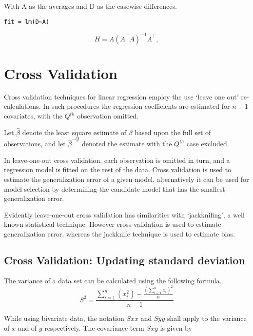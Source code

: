 \documentclass[12pt, a4paper]{article}
\begin{document}
With A as the averages and D as the casewise differences.
\begin{verbatim}
fit = lm(D~A)
\end{verbatim}

\begin{displaymath}
H = A \left(A^\top  A\right)^{-1} A^\top ,
\end{displaymath}

\newpage
\section{Cross Validation} %

Cross validation techniques for linear regression employ the use `leave one out' re-calculations. In such procedures the regression coefficients are estimated for $n-1$ covariates, with the $Q^{th}$ observation omitted.

Let $\hat{\beta}$ denote the least square estimate of $\beta$ based upon the full set of observations, and let
$\hat{\beta}^{-Q}$ denoted the estimate with the $Q^{th}$ case
excluded.


In leave-one-out cross validation, each observation is omitted in turn, and a regression model is fitted on the rest of the data. Cross validation is used to estimate the generalization error of a given model. alternatively it can be used for model selection by determining the candidate model that has the smallest generalization error.


Evidently leave-one-out cross validation has similarities with `jackknifing', a well known statistical technique. However cross validation is used to estimate generalization error, whereas the jackknife technique is used to estimate bias.

\subsection{Cross Validation: Updating standard deviation} %

The variance of a data set can be calculated using the following formula.
\begin{equation}
S^{2}=\frac{\sum_{i=1}^{n}(x_{i}^{2})-\frac{(\sum_{i=1}^{n}x_{i})^{2}}{n}}{n-1}
\end{equation}

While using bivariate data, the notation $Sxx$ and $Syy$ shall apply to the variance of $x$ and of $y$ respectively. The covariance term $Sxy$ is given by
\end{document}
